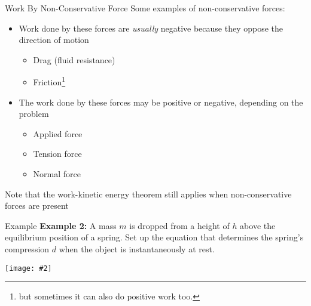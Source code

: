 \documentclass[12pt,compress,aspectratio=169]{beamer}
\newcommand{\pic}[2]{\texttt{[image: \#2]}}
\begin{document}
\begin{frame}{Work By Non-Conservative Force}
  Some examples of non-conservative forces:
  \begin{itemize}
  \item Work done by these forces are \emph{usually} negative because they
    oppose the direction of motion
    \begin{itemize}
    \item Drag (fluid resistance)
    \item Friction\footnote{but sometimes it can also do positive work too.}
    \end{itemize}
  \item The work done by these forces may be positive or negative, depending on
    the problem
    \begin{itemize}
    \item Applied force
    \item Tension force
    \item Normal force
    \end{itemize}
  \end{itemize}
  Note that the work-kinetic energy theorem still applies when non-conservative
  forces are present
  \vspace{.25in}
\end{frame}


\begin{frame}{Example}
  \textbf{Example 2:} A mass $m$ is dropped from a height of $h$ above the
  equilibrium position of a spring. Set up the equation that determines the
  spring's compression $d$ when the object is instantaneously at rest.
  \begin{center}
    \pic{.35}{spring-example1}
  \end{center}
\end{frame}


\end{document}
